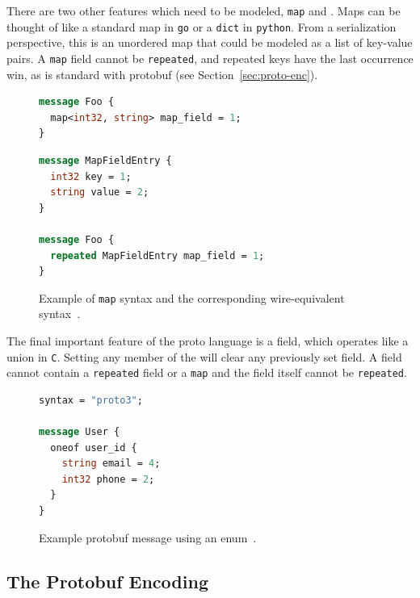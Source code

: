 There are two other features which need to be modeled, \texttt{map} and
\Oneof. Maps can be thought of like a standard map in \texttt{go} or a
\texttt{dict} in \texttt{python}. From a serialization perspective, this is an
unordered map that could be modeled as a list of key-value pairs. A \texttt{map}
field cannot be \texttt{repeated}, and repeated keys have the last occurrence
win, as is standard with protobuf (see Section~\ref{sec:proto-enc}).

\begin{figure}[H]
	\centering
	\begin{minipage}[bt]{0.43\textwidth}
		\begin{lstlisting}[language=proto]
message Foo {
  map<int32, string> map_field = 1;
}\end{lstlisting}
	\end{minipage}
	\hspace{0.5cm}
	\begin{minipage}[bt]{0.48\textwidth}
		\begin{lstlisting}[language=proto]
message MapFieldEntry {
  int32 key = 1;
  string value = 2;
}

message Foo {
  repeated MapFieldEntry map_field = 1;
}\end{lstlisting}
	\end{minipage}

	\caption{Example of \texttt{map} syntax and the corresponding
		wire-equivalent syntax~\cite{LanguageGuideProto}.}
	\label{fig:proto-map}
\end{figure}

The final important feature of the proto language is a \Oneof{} field,
which operates like a union in \texttt{C}. Setting any member of the
\Oneof{} will clear any previously set field. A \Oneof{} field
cannot contain a \texttt{repeated} field or a \texttt{map} and the
\Oneof{} field itself cannot be \texttt{repeated}.

\begin{figure}[H]
	\begin{lstlisting}[language=proto]
syntax = "proto3";

message User {
  oneof user_id {
    string email = 4;
    int32 phone = 2;
  }
}\end{lstlisting}

	\caption{Example protobuf message using an enum~\cite{LanguageGuideProto}.}
	\label{fig:proto-enum2}
\end{figure}

\subsection{The Protobuf Encoding}~\label{sec:proto-enc}

